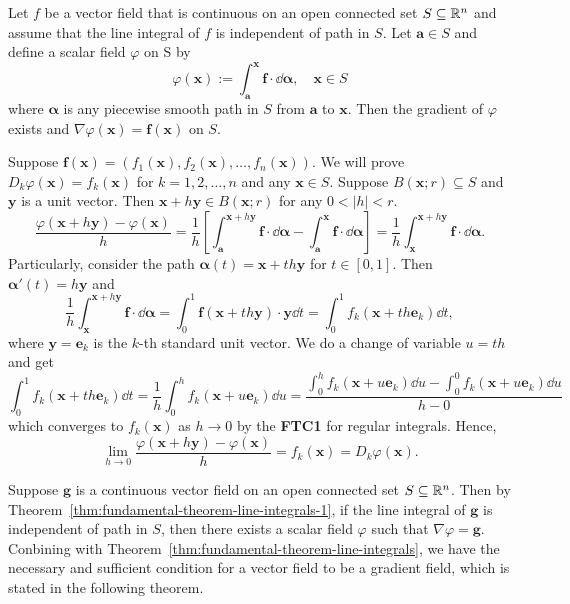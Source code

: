     \begin{theoremenv}\label{thm:fundamental-theorem-line-integrals-1}
        Let $f$ be a vector field that is continuous on an open connected set $S \subseteq \mathbb{R}^n$ and assume that the line integral of $f$ is independent of path in $S$. Let $\bm a\in S$ and define a scalar field $\varphi$ on S by
        $$ \varphi(\bm x) := \int_{\bm a}^{\bm x} \bm f \cdot \dd \bm \alpha, \quad \bm x \in S $$
        where $\bm \alpha$ is any piecewise smooth path in $S$ from $\bm a$ to $\bm x$. Then the gradient of $\varphi$ exists and $\nabla \varphi (\bm x)= \bm f(\bm x)$ on $S$.
    \end{theoremenv}
    \begin{proofenv}
        Suppose $\bm f (\bm x) = (f_1(\bm x), f_2(\bm x), \dots, f_n(\bm x))$. We will prove $D_k \varphi(\bm x) = f_k(\bm x)$ for $k=1,2,\dots,n$ and any $\bm x \in S$. Suppose $B(\bm x; r) \subseteq S$ and $\bm y$ is a unit vector. Then $\bm x + h \bm y \in B(\bm x; r)$ for any $0<|h| < r$.
        $$ \frac{\varphi(\bm x + h \bm y) - \varphi(\bm x)}{h} = \frac1h \left[ \int_{\bm a}^{\bm x + h \bm y} \bm f \cdot \dd \bm \alpha  - \int_{\bm a}^{\bm x} \bm f \cdot \dd \bm \alpha \right]  = \frac1h \int_{\bm x} ^{\bm x + h \bm y} \bm f \cdot \dd \bm \alpha. $$
        Particularly, consider the path $\bm \alpha(t) = \bm x + t h \bm y$ for $t\in [0,1]$. Then $\bm \alpha '(t) = h \bm y$ and
        $$ \frac1h \int_{\bm x} ^{\bm x + h \bm y} \bm f \cdot \dd \bm \alpha = \int_0^1 \bm f(\bm x + t h \bm y) \cdot \bm y \dd t = \int_0^1 f_k(\bm x + t h \bm e_k) \dd t,$$
        where $\bm y = \bm e_k$ is the $k$-th standard unit vector. We do a change of variable $u = t h$ and get
        $$ \int_0^1 f_k(\bm x + t h \bm e_k) \dd t = \frac1h \int_0^h f_k(\bm x + u \bm e_k) \dd u = \frac{\displaystyle \int_0^h f_k(\bm x + u \bm e_k) \dd u - \int_0^0 f_k(\bm x + u \bm e_k) \dd u}{h-0} $$
        which converges to $f_k(\bm x)$ as $h\to 0$ by the \textbf{FTC1} for regular integrals. Hence,
        $$ \lim_{h\to 0} \frac{\varphi(\bm x + h \bm y) - \varphi(\bm x)}{h} = f_k(\bm x) = D_k \varphi(\bm x). $$
    \end{proofenv}
    \begin{remarkenv}
        Suppose $\bm g$ is a continuous vector field on an open connected set $S \subseteq \mathbb{R}^n$. Then by Theorem~\ref{thm:fundamental-theorem-line-integrals-1}, if the line integral of $\bm g$ is independent of path in $S$, then there exists a scalar field $\varphi$ such that $\nabla \varphi = \bm g$. Conbining with Theorem~\ref{thm:fundamental-theorem-line-integrals}, we have the necessary and sufficient condition for a vector field to be a gradient field, which is stated in the following theorem.
    \end{remarkenv}
